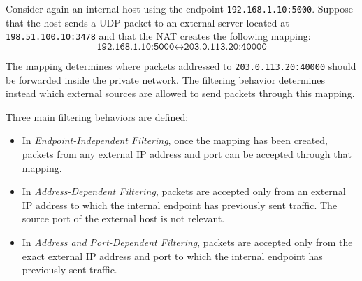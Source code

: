 Consider again an internal host using the endpoint \texttt{192.168.1.10:5000}. Suppose that the host sends a UDP packet to an external server located at \\ \texttt{198.51.100.10:3478} and that the NAT creates the following mapping: \[\texttt{192.168.1.10:5000}\longleftrightarrow\texttt{203.0.113.20:40000} \]

The mapping determines where packets addressed to \texttt{203.0.113.20:40000} should be forwarded inside the private network. The filtering behavior determines instead which external sources are allowed to send packets through this mapping.

Three main filtering behaviors are defined:

\begin{itemize}
	\item In \textit{Endpoint-Independent Filtering}, once the mapping has been created, packets from any external IP address and port can be accepted through that mapping.

	\item In \textit{Address-Dependent Filtering}, packets are accepted only from an external IP address to which the internal endpoint has previously sent traffic. The source port of the external host is not relevant.

	\item In \textit{Address and Port-Dependent Filtering}, packets are accepted only from the exact external IP address and port to which the internal endpoint has previously sent traffic.
\end{itemize}

